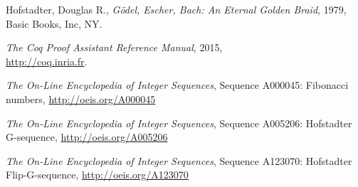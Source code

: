 \documentclass[a4paper,11pt]{article}
\begin{document}
\begin{thebibliography}{1}
 Hofstadter, Douglas R.,
 {\it Gödel, Escher, Bach: An Eternal Golden Braid},
 1979, Basic Books, Inc, NY.

 {\it The Coq Proof Assistant Reference Manual}, 2015,\\
 \mbox{\url{http://coq.inria.fr}}.

 {\it The On-Line Encyclopedia of Integer Sequences}, Sequence
 A000045: Fibonacci numbers, \url{http://oeis.org/A000045}

 {\it The On-Line Encyclopedia of Integer Sequences}, Sequence
 A005206: Hofstadter G-sequence, \url{http://oeis.org/A005206}

 {\it The On-Line Encyclopedia of Integer Sequences}, Sequence
 A123070: Hofstadter Flip-G-sequence, \url{http://oeis.org/A123070}

\end{thebibliography}
\end{document}
